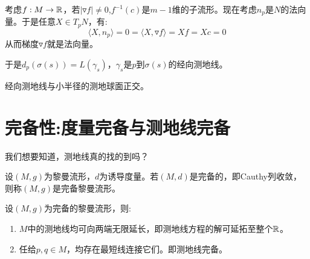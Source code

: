    考虑$f:M \to \mathbb{R}$，若$|\triangledown f|\neq 0$,$f^{-1}(c)$是$m-1$维的子流形。现在考虑$n_p$是$N$的法向量。于是任意$X \in T_p N$，有:
    $$
    \langle X,n_p\rangle =0=\langle X ,\triangledown f\rangle=Xf=Xc=0
    $$
    从而梯度$\triangledown f$就是法向量。

    于是$d_p(\sigma(s))=L(\gamma_s)$，$\gamma_s$是$p$到$\sigma(s)$的经向测地线。

    \begin{lemma}[Gauss]
        经向测地线与小半径的测地球面正交。
    \end{lemma}
    \section{完备性:度量完备与测地线完备}
    我们想要知道，测地线真的找的到吗？
    \begin{definition}
        设$(M,g)$为黎曼流形，$d$为诱导度量。若$(M,d)$是完备的，即Cauthy列收敛，则称$(M,g)$是完备黎曼流形。
    \end{definition}
    \begin{lemma}
        设$(M,g)$为完备的黎曼流形，则:
        \begin{enumerate}
            \item $M$中的测地线均可向两端无限延长，即测地线方程的解可延拓至整个$\mathbb{R}$。
            \item 任给$p,q \in M$，均存在最短线连接它们。即测地线完备。
        \end{enumerate}
    \end{lemma}
